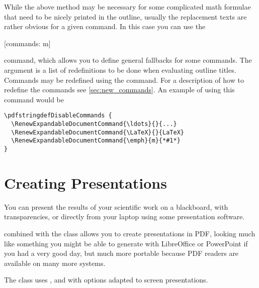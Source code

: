 While the above method may be necessary for some complicated math formulae
that need to be nicely printed in the outline, usually the replacement texts
are rather obvious for a given command. In this case you can use the
\begin{lscommand}
  [commands: m]
\end{lscommand}
command, which allows you to define general fallbacks for some commands. The
 argument is a list of redefinitions to be done when evaluating
outline titles. Commands may be redefined using the
 command. For a description of how to
redefine the commands see \autoref{sec:new_commands}. An example of using this
command would be
\begin{verbatim}
\pdfstringdefDisableCommands {
  \RenewExpandableDocumentCommand{\ldots}{}{...}
  \RenewExpandableDocumentCommand{\LaTeX}{}{LaTeX}
  \RenewExpandableDocumentCommand{\emph}{m}{*#1*}
}
\end{verbatim}

\section{Creating Presentations}%
\label{sec:beamer}
You can present the results of your scientific work on a blackboard,
with transparencies, or directly from your laptop using some
presentation software.

 combined with the  class allows you to
create presentations in PDF, looking much like something you might be
able to generate with LibreOffice or PowerPoint if you had a very good day, but much
more portable because PDF readers are available on many more
systems.

The  class uses ,  and
 with options adapted to screen presentations.


